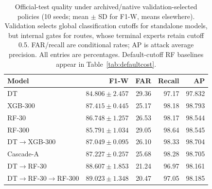 \begin{table}[!htbp]
\centering
\caption{Official-test quality under archived/native validation-selected policies (10 seeds; mean $\pm$ SD for F1-W, means elsewhere). Validation selects global classification cutoffs for standalone models, but internal gates for routes, whose terminal experts retain cutoff 0.5. FAR/recall are conditional rates; AP is attack average precision. All entries are percentages. Default-cutoff RF baselines appear in Table~\ref{tab:defaultcost}.}
\label{tab:quality}
\small
\setlength{\tabcolsep}{4pt}
\begin{tabularx}{\textwidth}{@{}Xrrrr@{}}
\toprule
Model & F1-W & FAR & Recall & AP \\
\midrule
DT & $84.806\pm2.457$ & 29.36 & 97.17 & 97.832 \\
XGB-300 & $87.415\pm0.445$ & 25.17 & 98.18 & 98.793 \\
RF-30 & $86.748\pm1.257$ & 26.53 & 98.17 & 98.544 \\
RF-300 & $85.791\pm1.034$ & 29.05 & 98.64 & 98.545 \\
DT$\to$XGB-300 & $87.049\pm0.095$ & 26.10 & 98.33 & 98.704 \\
Cascade-A & $87.227\pm0.257$ & 25.68 & 98.28 & 98.705 \\
DT$\to$RF-30 & $88.607\pm1.853$ & 21.24 & 96.97 & 98.161 \\
DT$\to$RF-30$\to$RF-300 & $89.023\pm1.348$ & 20.47 & 97.05 & 98.185 \\
\bottomrule
\end{tabularx}
\end{table}
